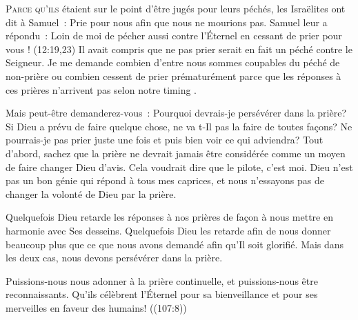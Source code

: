 




\lettrine{P}{arce qu'ils} étaient sur le point d'être jugés pour leurs péchés,
 les Israëlites ont dit à Samuel~: 
 \og Prie pour nous afin que nous ne mourions pas. \fg{} 
 Samuel leur a répondu~: 
 \og Loin de moi de pécher aussi contre l'Éternel en cessant de prier
 pour vous ! \fg{}
 (12:19,23)
 Il avait compris que ne pas prier serait en fait un péché contre le Seigneur.
 Je me demande combien d'entre nous sommes coupables du péché de
 \og non-prière \fg{} ou combien cessent de prier prématurément
 parce que les réponses à ces prières n'arrivent pas
 selon notre \og timing \fg{}.


Mais peut-être demanderez-vous~: 
 \og Pourquoi devrais-je persévérer dans la prière?
 Si Dieu a prévu de faire quelque chose, ne va t-Il pas la faire
 de toutes façons? Ne pourrais-je pas prier juste une fois et puis bien voir
 ce qui adviendra? \fg{}
 Tout d'abord, sachez que la prière ne devrait jamais être considérée
 comme un moyen de faire changer Dieu d'avis.
 Cela voudrait dire que le pilote, c'est moi.
 Dieu n'est pas un bon génie qui répond à tous mes caprices,
 et nous n'essayons pas de changer la volonté de Dieu par la prière.

Quelquefois Dieu retarde les réponses à nos prières de façon à nous mettre
 en harmonie avec Ses desseins. Quelquefois Dieu les retarde afin de nous
 donner beaucoup plus que ce que nous avons demandé afin qu'Il soit glorifié.
 Mais dans les deux cas, nous devons persévérer dans la prière.

Puissions-nous nous adonner à la prière continuelle, et puissions-nous
 être reconnaissants.
 \og Qu'ils célèbrent l'Éternel pour sa bienveillance et pour ses merveilles
 en faveur des humains! \fg{} ((107:8))

\dvrule



